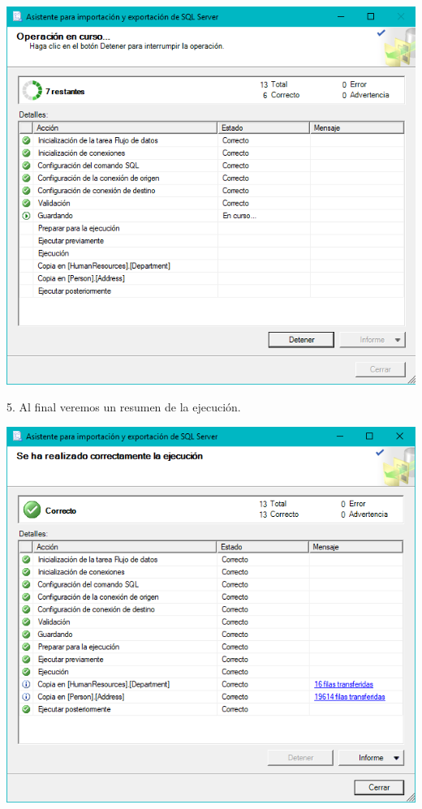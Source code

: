 	\begin{center}
	\includegraphics[width=\columnwidth]{images/task1/img11}
    \end{center}	
    
5. Al final veremos un resumen de la ejecución.
	\begin{center}
	\includegraphics[width=\columnwidth]{images/task1/img12}
	\end{center}	